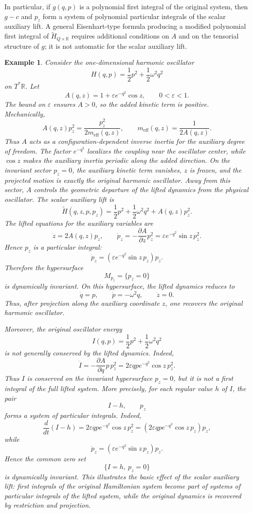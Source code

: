 \documentclass[10pt,a4paper]{article}
\newtheorem{example}{Example}
\begin{document}
In particular, if \(g(q,p)\) is a polynomial first integral of the original system, then \(g-c\) and \(p_z\) form a system of polynomial particular integrals of the scalar auxiliary lift. A general Eisenhart-type formula producing a modified polynomial first integral of \(\widetilde H_{Q\times\mathbb R}\) requires additional conditions on \(A\) and on the tensorial structure of \(g\); it is not automatic for the scalar auxiliary lift.



\begin{example}
\label{ex:scalarauxiliarylift}
Consider the one-dimensional harmonic oscillator
\[
H(q,p)=\frac{1}{2}p^2+\frac{1}{2}\omega^2q^2
\]
on $T^*\mathbb R$. Let
\[
A(q,z)=1+\varepsilon e^{-q^2}\cos z,
\qquad 0<\varepsilon<1.
\]
The bound on \(\varepsilon\) ensures \(A>0\), so the added kinetic term is positive. Mechanically,
\[
A(q,z)p_z^2
=
\frac{p_z^2}{2m_{\mathrm{eff}}(q,z)},
\qquad
m_{\mathrm{eff}}(q,z)=\frac{1}{2A(q,z)} .
\]
Thus \(A\) acts as a configuration-dependent inverse inertia for the auxiliary degree of freedom. The factor \(e^{-q^2}\) localizes the coupling near the oscillator center, while \(\cos z\) makes the auxiliary inertia periodic along the added direction. On the invariant sector \(p_z=0\), the auxiliary kinetic term vanishes, \(z\) is frozen, and the projected motion is exactly the original harmonic oscillator. Away from this sector, \(A\) controls the geometric departure of the lifted dynamics from the physical oscillator.
The scalar auxiliary lift is
\[
\widetilde H(q,z,p,p_z)
=
\frac{1}{2}p^2+\frac{1}{2}\omega^2q^2
+
A(q,z)p_z^2 .
\]
The lifted equations for the auxiliary variables are
\[
\dot z=2A(q,z)p_z,
\qquad
\dot p_z=-\frac{\partial A}{\partial z}p_z^2
=
\varepsilon e^{-q^2}\sin z\,p_z^2.
\]
Hence $p_z$ is a particular integral:
\[
\dot p_z=
\left(\varepsilon e^{-q^2}\sin z\,p_z\right)p_z.
\]
Therefore the hypersurface
\[
M_{p_z}=\{p_z=0\}
\]
is dynamically invariant. On this hypersurface, the lifted dynamics reduces to
\[
\dot q=p,
\qquad
\dot p=-\omega^2q,
\qquad
\dot z=0.
\]
Thus, after projection along the auxiliary coordinate $z$, one recovers the original harmonic oscillator.

Moreover, the original oscillator energy
\[
I(q,p)=\frac{1}{2}p^2+\frac{1}{2}\omega^2q^2
\]
is not generally conserved by the lifted dynamics. Indeed,
\[
\dot I
=
-\frac{\partial A}{\partial q}p\,p_z^2
=
2\varepsilon q p e^{-q^2}\cos z\,p_z^2.
\]
Thus $I$ is conserved on the invariant hypersurface $p_z=0$, but it is not a first integral of the full lifted system. More precisely, for each regular value $h$ of $I$, the pair
\[
I-h,\qquad p_z
\]
forms a system of particular integrals. Indeed,
\[
\frac{d}{dt}(I-h)
=
2\varepsilon qpe^{-q^2}\cos z\,p_z^2
=
\left(2\varepsilon qpe^{-q^2}\cos z\,p_z\right)p_z,
\]
while
\[
\dot p_z=
\left(\varepsilon e^{-q^2}\sin z\,p_z\right)p_z.
\]
Hence the common zero set
\[
\{I=h,\ p_z=0\}
\]
is dynamically invariant. This illustrates the basic effect of the scalar auxiliary lift: first integrals of the original Hamiltonian system become part of systems of particular integrals of the lifted system, while the original dynamics is recovered by restriction and projection.
\end{example}
\end{document}
